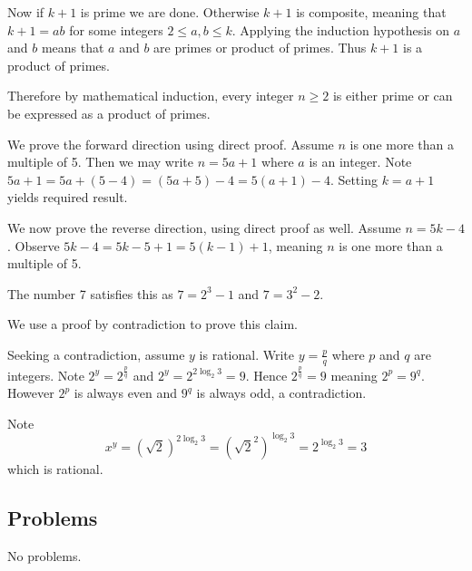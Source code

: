 \begin{questions}
    Now if $k + 1$ is prime we are done. Otherwise $k + 1$ is composite, meaning that $k + 1 = ab$ for some integers $2 \leq a,b \leq k$. Applying the induction hypothesis on $a$ and $b$ means that $a$ and $b$ are primes or product of primes. Thus $k + 1$ is a product of primes.

    Therefore by mathematical induction, every integer $n \geq 2$ is either prime or can be expressed as a product of primes.

    \item We prove the forward direction using direct proof. Assume $n$ is one more than a multiple of 5. Then we may write $n = 5a + 1$ where $a$ is an integer. Note $5a + 1 = 5a + (5 - 4) = (5a + 5) - 4 = 5(a+1) - 4$. Setting $k = a+1$ yields required result.

    We now prove the reverse direction, using direct proof as well. Assume $n = 5k - 4$. Observe $5k - 4 = 5k - 5 + 1 = 5(k-1) + 1$, meaning $n$ is one more than a multiple of 5.

    \item The number 7 satisfies this as $7 = 2^3 - 1$ and $7 = 3^2 - 2$.

    \item \begin{partquestions}{\roman*}
        \item We use a proof by contradiction to prove this claim.

        Seeking a contradiction, assume $y$ is rational. Write $y = \frac pq$ where $p$ and $q$ are integers. Note $2^y = 2^{\frac pq}$ and $2^y = 2^{2\log_2{3}} = 9$. Hence $2^{\frac pq} = 9$ meaning $2^p = 9^q$. However $2^p$ is always even and $9^q$ is always odd, a contradiction.

        \item Note
        \[
            x^y = (\sqrt2)^{2\log_2{3}} = \left(\sqrt{2}^2\right)^{\log_2{3}} = 2^{\log_2{3}} = 3
        \]
        which is rational.
    \end{partquestions}
\end{questions}

\subsection*{Problems}
No problems.
